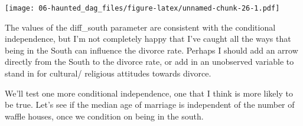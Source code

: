 \documentclass[
]{book}
\newenvironment{Shaded}{\begin{snugshade}}{\end{snugshade}}
\newcommand{\AttributeTok}[1]{\textcolor[rgb]{0.77,0.63,0.00}{#1}}
\newcommand{\DecValTok}[1]{\textcolor[rgb]{0.00,0.00,0.81}{#1}}
\newcommand{\FloatTok}[1]{\textcolor[rgb]{0.00,0.00,0.81}{#1}}
\newcommand{\FunctionTok}[1]{\textcolor[rgb]{0.00,0.00,0.00}{#1}}
\newcommand{\NormalTok}[1]{#1}
\newcommand{\OtherTok}[1]{\textcolor[rgb]{0.56,0.35,0.01}{#1}}
\newcommand{\SpecialCharTok}[1]{\textcolor[rgb]{0.00,0.00,0.00}{#1}}
\begin{document}
\texttt{[image: 06-haunted\_dag\_files/figure-latex/unnamed-chunk-26-1.pdf]}

The values of the diff\_south parameter are consistent with the conditional independence, but I'm not completely happy that I've caught all the ways that being in the South can influence the divorce rate. Perhaps I should add an arrow directly from the South to the divorce rate, or add in an unobserved variable to stand in for cultural/ religious attitudes towards divorce.

We'll test one more conditional independence, one that I think is more likely to be true. Let's see if the median age of marriage is independent of the number of waffle houses, once we condition on being in the south.

\begin{Shaded}
\end{Shaded}
\end{document}
